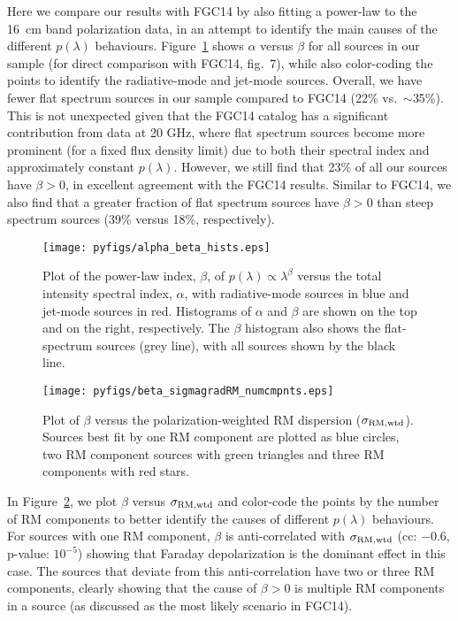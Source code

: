 \documentclass{mnras}
\newcommand*\sigmaRMwtd{\sigma_{\rm RM, wtd}}
\begin{document}
Here we compare our results with FGC14 by also fitting a power-law to the 16~cm band polarization data, in an attempt to identify the main causes of the different $p(\lambda)$ behaviours. 
Figure~\ref{spixbeta} shows $\alpha$ versus $\beta$ for all sources in our sample (for direct comparison with FGC14, fig.~7), while also color-coding the points to identify the radiative-mode and jet-mode sources. Overall, we have fewer flat spectrum sources in our sample compared to FGC14 (22\% vs.~$\sim$35\%). This is not unexpected given that the FGC14 catalog has a significant contribution from data at 20 GHz, where flat spectrum sources become more prominent (for a fixed flux density limit) due to both their spectral index and approximately constant $p(\lambda)$. However, we still find that 23\% of all our sources have $\beta > 0$, in excellent agreement with the FGC14 results. Similar to FGC14, we also find that a greater fraction of flat spectrum sources have $\beta>0$ than steep spectrum sources (39\% versus 18\%, respectively). 

\begin{figure} 
\centering
    \texttt{[image: pyfigs/alpha\_beta\_hists.eps]} 
    \caption{ {\small Plot of the power-law index, $\beta$, of $p(\lambda)\propto\lambda^\beta$ versus the total intensity spectral index, $\alpha$, 
    with radiative-mode sources in blue and jet-mode sources in red. Histograms of $\alpha$ and $\beta$ are shown on the top and on the right, respectively. 
    The $\beta$ histogram also shows the flat-spectrum sources (grey line), with all sources shown by the black line. } }
    \label{spixbeta}
\end{figure}  

\begin{figure} 
\centering
    \texttt{[image: pyfigs/beta\_sigmagradRM\_numcmpnts.eps]} 
    \caption{ {\small Plot of $\beta$ versus the polarization-weighted RM dispersion ($\sigmaRMwtd$). Sources best fit by one RM component 
    are plotted as blue circles, two RM component sources with green triangles and three RM components with red stars. } }
    \label{sigmaRMbeta}
\end{figure}  

In Figure~\ref{sigmaRMbeta}, we plot $\beta$ versus $\sigmaRMwtd$ and color-code the points by the number of RM components to better identify the causes of different $p(\lambda)$ behaviours. For sources with one RM component, $\beta$ is anti-correlated with $\sigmaRMwtd$ (cc: $-0.6$, p-value: $10^{-5}$) showing that Faraday depolarization is the dominant effect in this case. The sources that deviate from this anti-correlation have two or three RM components, clearly showing that the cause of $\beta>0$ is multiple RM components in a source (as discussed as the most likely scenario in FGC14).
\end{document}
